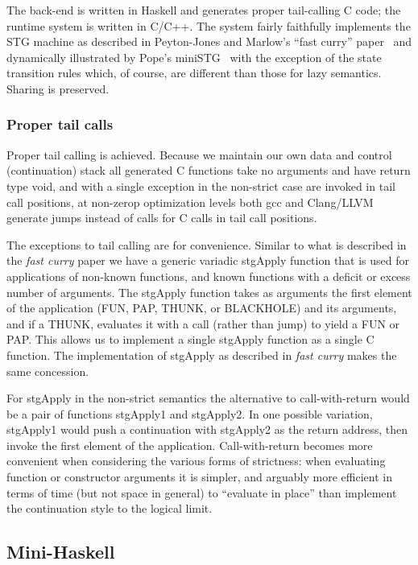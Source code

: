 \documentclass{llncs}
\begin{document}
The back-end is written in Haskell and generates proper tail-calling C code;
the runtime system is written in C/C++.  The system fairly faithfully
implements the STG machine as described in Peyton-Jones and Marlow's ``fast
curry'' paper~\cite{fastcurry} and dynamically illustrated by Pope's
miniSTG~\cite{ministg} with the exception of the state transition rules which,
of course, are different than those for lazy semantics.  Sharing is preserved.

\subsubsection{Proper tail calls}

Proper tail calling is achieved.  Because we maintain our own data and control
(continuation) stack all generated C functions take no arguments and have
return type void, and with a single exception in the non-strict case are
invoked in tail call positions, at non-zerop optimization levels both gcc and
Clang/LLVM generate jumps instead of calls for C calls in tail call positions.

The exceptions to tail calling are for convenience.  Similar to what is
described in the \emph{fast curry} paper we have a generic variadic stgApply
function that is used for applications of non-known functions, and known
functions with a deficit or excess number of arguments.  The stgApply function
takes as arguments the first element of the application (FUN, PAP, THUNK, or
BLACKHOLE) and its arguments, and if a THUNK, evaluates it with a call (rather
than jump) to yield a FUN or PAP.  This allows us to implement a single
stgApply function as a single C function.  The implementation of stgApply as
described in \emph{fast curry} makes the same concession.

For stgApply in the non-strict semantics the alternative to call-with-return
would be a pair of functions stgApply1 and stgApply2.  In one possible variation,
stgApply1 would push a continuation with stgApply2 as the return address, then
invoke the first element of the application.  Call-with-return becomes more
convenient when considering the various forms of strictness:  when evaluating
function or constructor arguments it is simpler, and arguably more efficient
in terms of time (but not space in general) to ``evaluate in place'' than
implement the continuation style to the logical limit.

\subsection{Mini-Haskell}
\end{document}
